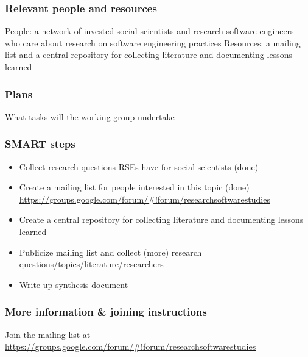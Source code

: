 \subsubsection{Relevant people and resources}

People: a network of invested social scientists and research software engineers who care about research on software engineering practices
Resources: a mailing list and a central repository for collecting literature and documenting lessons learned

\subsubsection{Plans}

What tasks will the working group undertake \todo{}

\subsubsection{SMART steps}

\begin{itemize}
\item Collect research questions RSEs have for social scientists (done)
\item Create a mailing list for people interested in this topic (done) \url{https://groups.google.com/forum/#!forum/researchsoftwarestudies}
\item Create a central repository for collecting literature and documenting lessons learned
\item Publicize mailing list and collect (more) research questions/topics/literature/researchers
\item Write up synthesis document 
\end{itemize}

\subsubsection{More information \& joining instructions}

Join the mailing list at \url{https://groups.google.com/forum/#!forum/researchsoftwarestudies}
